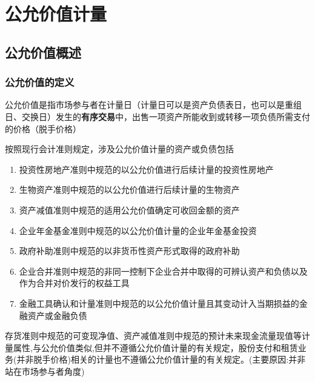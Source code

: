 \documentclass[UTF8,12pt]{ctexart}
\numberwithin{equation}{section} %
\numberwithin{figure}{section}
\numberwithin{table}{section}
\begin{document}
	\newpage
	
	\section{公允价值计量}
	\subsection{公允价值概述}
	
	\subsubsection{公允价值的定义}
	公允价值是指市场参与者在计量日（计量日可以是资产负债表日，也可以是重组日、交换日）发生的\textbf{有序交易}中，出售一项资产所能收到或转移一项负债所需支付的价格（脱手价格）
	
	
	
	按照现行会计准则规定，涉及公允价值计量的资产或负债包括
	\begin{enumerate}
		\item 投资性房地产准则中规范的以公允价值进行后续计量的投资性房地产
		
		\item 生物资产准则中规范的以公允价值进行后续计量的生物资产
		
		\item 资产减值准则中规范的适用公允价值确定可收回金额的资产
		
		\item 企业年金基金准则中规范的以公允价值计量的企业年金基金投资
		
		\item 政府补助准则中规范的以非货币性资产形式取得的政府补助
		
		\item 企业合并准则中规范的非同一控制下企业合并中取得的可辨认资产和负债以及作为合并对价发行的权益工具
		
		\item 金融工具确认和计量准则中规范的以公允价值计量且其变动计入当期损益的金融资产或金融负债
	\end{enumerate}
	存货准则中规范的可变现净值、资产减值准则中规范的预计未来现金流量现值等计量属性,与公允价值类似,但并不遵循公允价值计量的有关规定，股份支付和租赁业务(并非脱手价格)相关的计量也不遵循公允价值计量的有关规定。(主要原因:并非站在市场参与者角度)
	
\end{document}
